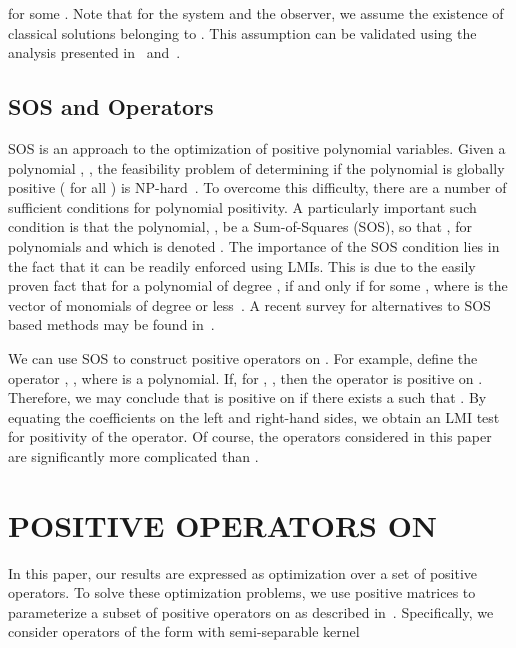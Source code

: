 \documentclass[US letter, 9 pt, conference]{ieeeconf}  \usepackage{setspace}
\begin{document}
for some . Note that for the system and the observer, we assume the existence of classical solutions belonging to . This assumption can be validated using the analysis presented in~\cite{balogh2004stability} and~\cite{fridman2009lmi}.

\subsection{SOS and Operators}\label{subsec:sos}
SOS is an approach to  the optimization of positive polynomial variables. Given a polynomial , , the feasibility problem of determining if the polynomial is globally positive ( for all ) is NP-hard~\cite{blum1998complexity}. To overcome this difficulty, there are a number of sufficient conditions for polynomial positivity. A particularly important such condition is that the polynomial, , be a Sum-of-Squares (SOS), so that , for polynomials   and which is denoted . The importance of the SOS condition lies in the fact that it can be readily enforced using LMIs. This is due to the easily proven fact that for a polynomial  of degree ,  if and only if  for some , where  is the vector of monomials of degree  or less~\cite{parrilo2000structured}.  A recent survey for alternatives to SOS based methods may be found in~\cite{kamyar2014polynomial}.

We can use SOS to construct positive operators on . For example, define the operator , , where  is a polynomial. If, for , , then the operator  is positive on . Therefore, we may conclude that  is positive on  if there exists a  such that
 . By equating the coefficients on the left and right-hand sides, we obtain an LMI test for positivity of the operator. Of course, the operators considered in this paper are significantly more complicated than .
\section{POSITIVE OPERATORS ON }\label{sec:posop}
In this paper, our results are expressed as optimization over a set of positive operators. To solve these optimization problems, we use positive matrices to parameterize a subset of positive operators on  as described in~\cite{peetlmi}. Specifically, we consider operators of the form
 with semi-separable kernel
\end{document}

